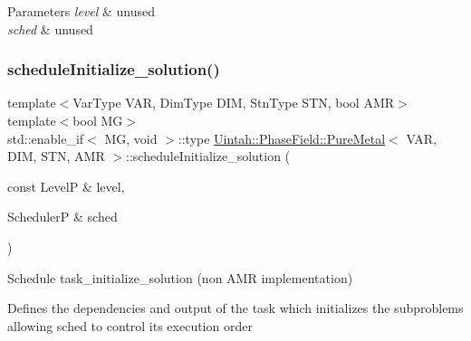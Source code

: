 \begin{DoxyParams}{Parameters}
{\em level} & unused \\
\hline
{\em sched} & unused \\
\hline
\end{DoxyParams}
\mbox{\label{classUintah_1_1PhaseField_1_1PureMetal_a1af29773c5193a9dbb14ff3988bba4fd}} 
\subsubsection{\texorpdfstring{schedule\+Initialize\+\_\+solution()}{scheduleInitialize\_solution()}\hspace{0.1cm}{\footnotesize\ttfamily [1/2]}}
{\footnotesize\ttfamily template$<$Var\+Type V\+AR, Dim\+Type D\+IM, Stn\+Type S\+TN, bool A\+MR$>$ \\
template$<$bool MG$>$ \\
std\+::enable\+\_\+if$<$ MG, void $>$\+::type \hyperlink{classUintah_1_1PhaseField_1_1PureMetal}{Uintah\+::\+Phase\+Field\+::\+Pure\+Metal}$<$ V\+AR, D\+IM, S\+TN, A\+MR $>$\+::schedule\+Initialize\+\_\+solution (\begin{DoxyParamCaption}\item[{const LevelP \&}]{level,  }\item[{SchedulerP \&}]{sched }\end{DoxyParamCaption})\hspace{0.3cm}{\ttfamily [protected]}}



Schedule task\+\_\+initialize\+\_\+solution (non A\+MR implementation) 

Defines the dependencies and output of the task which initializes the subproblems allowing sched to control its execution order


